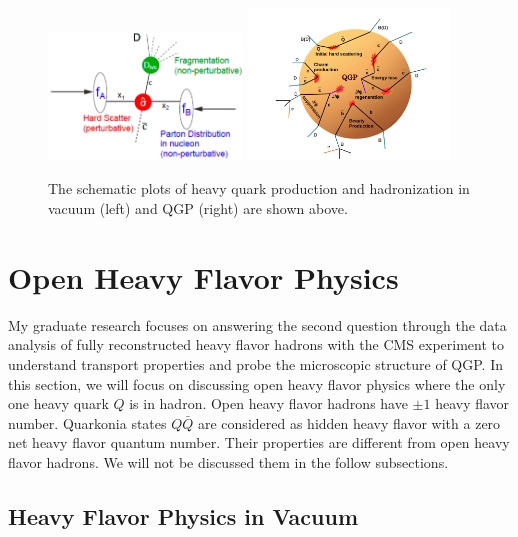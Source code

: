  \begin{figure}[hbtp]
\begin{center}
\includegraphics[width=0.46\textwidth]{Figures/Chapter1/HQVacuum.png}
\includegraphics[width=0.48\textwidth]{Figures/Chapter1/HQQGP.png}
\caption{The schematic plots of heavy quark production and hadronization in vacuum (left) and QGP (right) are shown above.}
\label{HQ}
\end{center}
\end{figure}   


\section{Open Heavy Flavor Physics}

My graduate research focuses on answering the second question through the data analysis of fully reconstructed heavy flavor hadrons with the CMS experiment to understand transport properties and probe the microscopic structure of QGP. In this section, we will focus on discussing open heavy flavor physics where the only one heavy quark $Q$ is in hadron. Open heavy flavor hadrons have $\pm 1$ heavy flavor number. Quarkonia states $Q\bar Q$ are considered as hidden heavy flavor with a zero net heavy flavor quantum number. Their properties are different from open heavy flavor hadrons. We will not be discussed them in the follow subsections. 

\subsection{Heavy Flavor Physics in Vacuum}


